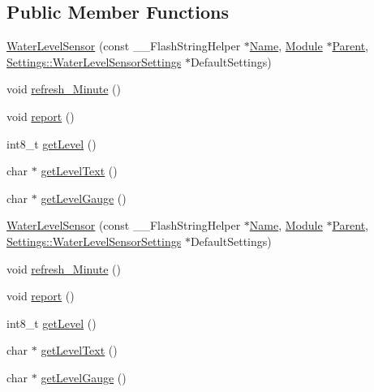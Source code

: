 \subsection*{Public Member Functions}
\begin{DoxyCompactItemize}
\item 
\hyperlink{class_water_level_sensor_aae6f402057511b5a9c30024dc483244c}{Water\+Level\+Sensor} (const \+\_\+\+\_\+\+Flash\+String\+Helper $\ast$\hyperlink{class_common_aeea91a726dbe988e515057b32ba0726f}{Name}, \hyperlink{class_module}{Module} $\ast$\hyperlink{class_water_level_sensor_a5de4738d98dc4a28ecdf9614f5198dfc}{Parent}, \hyperlink{struct_settings_1_1_water_level_sensor_settings}{Settings\+::\+Water\+Level\+Sensor\+Settings} $\ast$Default\+Settings)
\item 
void \hyperlink{class_water_level_sensor_a3e3ab8ae53f09d5c0ac6df1b3ba3671f}{refresh\+\_\+\+Minute} ()
\item 
void \hyperlink{class_water_level_sensor_af9082a30fbe3af588c2bd3c82acfaf8e}{report} ()
\item 
int8\+\_\+t \hyperlink{class_water_level_sensor_ae5a376c1a3ba9cc65a957f1c5cd6ddc0}{get\+Level} ()
\item 
char $\ast$ \hyperlink{class_water_level_sensor_a8093a4963a9ac42e5f7c923db6758c1f}{get\+Level\+Text} ()
\item 
char $\ast$ \hyperlink{class_water_level_sensor_ac0fe047b12952693055ed7222d7a4aaa}{get\+Level\+Gauge} ()
\item 
\hyperlink{class_water_level_sensor_aae6f402057511b5a9c30024dc483244c}{Water\+Level\+Sensor} (const \+\_\+\+\_\+\+Flash\+String\+Helper $\ast$\hyperlink{class_common_aeea91a726dbe988e515057b32ba0726f}{Name}, \hyperlink{class_module}{Module} $\ast$\hyperlink{class_water_level_sensor_a5de4738d98dc4a28ecdf9614f5198dfc}{Parent}, \hyperlink{struct_settings_1_1_water_level_sensor_settings}{Settings\+::\+Water\+Level\+Sensor\+Settings} $\ast$Default\+Settings)
\item 
void \hyperlink{class_water_level_sensor_a3e3ab8ae53f09d5c0ac6df1b3ba3671f}{refresh\+\_\+\+Minute} ()
\item 
void \hyperlink{class_water_level_sensor_af9082a30fbe3af588c2bd3c82acfaf8e}{report} ()
\item 
int8\+\_\+t \hyperlink{class_water_level_sensor_ae5a376c1a3ba9cc65a957f1c5cd6ddc0}{get\+Level} ()
\item 
char $\ast$ \hyperlink{class_water_level_sensor_a8ce47502998f27993200d07c8c27856d}{get\+Level\+Text} ()
\item 
char $\ast$ \hyperlink{class_water_level_sensor_ac70ec72b5b11b4de56d7297c00c060ee}{get\+Level\+Gauge} ()
\end{DoxyCompactItemize}
